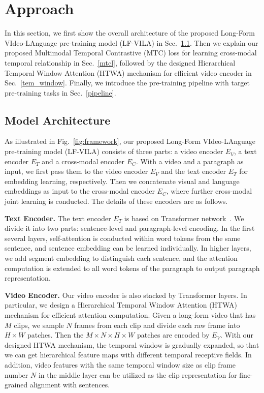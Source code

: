 \documentclass{article}
\begin{document}
\section{Approach}
\label{method}

In this section, we first show the overall architecture of the proposed Long-Form VIdeo-LAnguage pre-training model (LF-VILA) in Sec.~\ref{model_arch}. Then we explain our proposed Multimodal Temporal Contrastive (MTC) loss for learning cross-modal temporal relationship in Sec.~\ref{mtcl}, followed by the designed Hierarchical Temporal Window Attention (HTWA) mechanism for efficient video encoder in Sec.~\ref{tem_window}. Finally, we introduce the pre-training pipeline with target pre-training tasks in Sec.~\ref{pipeline}.

\subsection{Model Architecture}\label{model_arch}
As illustrated in Fig.~\ref{fig:framework}, our proposed Long-Form VIdeo-LAnguage pre-training model (LF-VILA) consists of three parts: a video encoder $E_V$, a text encoder $E_T$ and a cross-modal encoder $E_C$. With a video and a paragraph as input, we first pass them to the video encoder $E_V$ and the text encoder $E_T$ for embedding learning, respectively. Then we concatenate visual and language embeddings as input to the cross-modal encoder $E_C$, where further cross-modal joint learning is conducted. The details of these encoders are as follows.

\textbf{Text Encoder.}
The text encoder $E_T$ is based on Transformer network~\cite{vaswani2017transformer}. We divide it into two parts: sentence-level and paragraph-level encoding. In the first several layers, self-attention is conducted within word tokens from the same sentence, and sentence embedding can be learned individually. 
In higher layers, we add segment embedding to distinguish each sentence, and the attention computation is extended to all word tokens of the paragraph to output paragraph representation. 

\textbf{Video Encoder.} 
Our video encoder is also stacked by Transformer layers. In particular, we design a Hierarchical Temporal Window Attention (HTWA) mechanism for efficient attention computation. Given a long-form video that has $M$ clips, we sample $N$ frames from each clip and divide each raw frame into $H \times W$ patches. Then the $M\times N \times H\times W$ patches are encoded by $E_V$. With our designed HTWA mechanism, the temporal window is gradually expanded, so that we can get hierarchical feature maps with different temporal receptive fields. In addition, video features with the same temporal window size as clip frame number $N$ in the middle layer can be utilized as the clip representation for fine-grained alignment with sentences.
\end{document}
